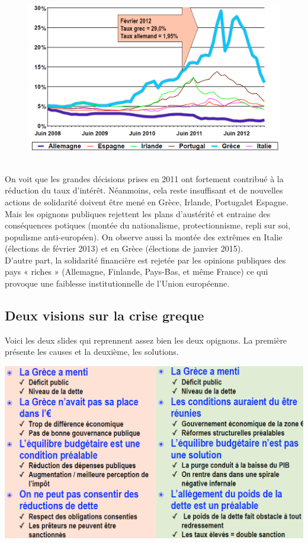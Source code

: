 \begin{figure}
\includegraphics[scale=0.3]{40}
\end{figure}
\ \\ On voit que les grandes décisions prises en 2011 ont fortement contribué à la réduction du taux d'intérêt. Néanmoins, cela reste insuffisant et de nouvelles actions de solidarité doivent être mené en Grèce, Irlande, Portugalet Espagne. Mais les opignons publiques rejettent les plans d'austérité et entraine des conséquences potiques (montée du nationalisme, protectionnisme, repli sur soi, populisme anti-européen). On observe aussi la montée des extrêmes en Italie (élections de février 2013) et en Grèce (élections de janvier 2015). \\
D'autre part, la solidarité financière est rejetée par les opinions publiques des
pays « riches » (Allemagne, Finlande, Pays-Bas, et même France) ce qui provoque une faiblesse institutionnelle de l’Union européenne.

\subsection{Deux visions sur la crise greque}
Voici les deux slides qui reprennent assez bien les deux opignons. La première présente les causes et la deuxième, les solutions. 

\begin{center}
\includegraphics[scale=0.5]{41}
\end{center}

